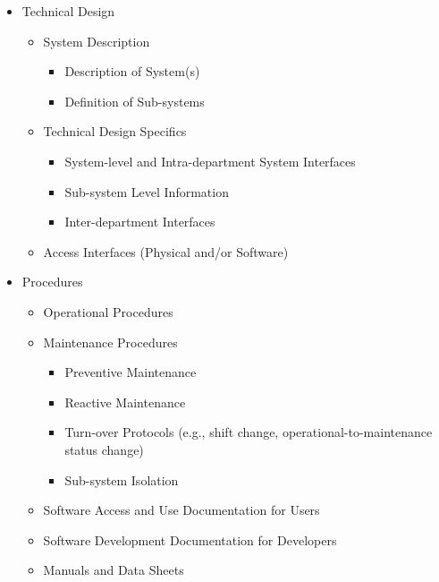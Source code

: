\begin{small}

\begin{itemize}
  \item Technical Design
	\begin{itemize}

	  \item System Description
		\begin{itemize}
		  \item Description of System(s)
		  \item Definition of Sub-systems
		\end{itemize}

	  \item Technical Design Specifics
		\begin{itemize}
		  \item System-level and Intra-department System Interfaces
		  \item Sub-system Level Information
		  \item Inter-department Interfaces
		\end{itemize}
	  \item Access Interfaces (Physical and/or Software)
	\end{itemize}


  \item Procedures
	\begin{itemize}

	  \item Operational Procedures

	  \item Maintenance Procedures
		\begin{itemize}
		  \item Preventive Maintenance
		  \item Reactive Maintenance
		  \item Turn-over Protocols (e.g., shift change, operational-to-maintenance status change)
		  \item Sub-system Isolation
		\end{itemize}

	  \item Software Access and Use Documentation for Users

	  \item Software Development Documentation for Developers

	  \item Manuals and Data Sheets
	\end{itemize}



\end{itemize}
\end{small}
